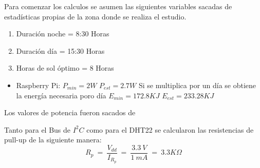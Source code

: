 Para comenzar los calculos se asumen las siguientes variables sacadas de estadísticas propias de la zona donde se realiza el estudio.
\begin{enumerate}
\item Duración noche = 8:30 Horas
\item Duración día = 15:30 Horas
\item Horas de sol  óptimo = 8 Horas
\end{enumerate}
\begin{itemize}
\item Raspberry Pi:
$P_{min} = 2W$
$P_{est} = 2.7W$
Si se multiplica por un  día se obtiene la energía necesaria poro día
$E_{min} = 172.8KJ$
$E_{est} = 233.28KJ$
\end{itemize}
Los valores de potencia fueron sacados de 

Tanto para el Bus de $I^2C$ como para el DHT22 se calcularon las resistencias de pull-up de la siguiente manera:
\begin{equation}
R_p \ = \  \frac{V_{dd}}{I_{R_p}} \ = \ \frac{3.3 \ V}{1 \ mA} \ = \ 3.3K\Omega  
\end{equation}
